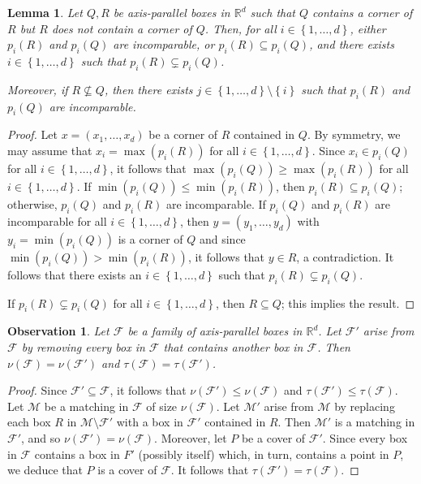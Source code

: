 \documentclass[12pt]{amsart}
\theoremstyle{plain}
\newtheorem{lemma}[theorem]{Lemma}
\newtheorem{observation}[theorem]{Observation}
\theoremstyle{definition}
\theoremstyle{remark}
\newcommand{\F}{\mathcal{F}}
\newcommand{\M}{\mathcal{M}}
\newcommand{\R}{\mathbb{R}}
\newcommand{\sset}[1]{\left\{#1\right\}}
\begin{document}
\begin{lemma} \label{lem:contains} Let $Q, R$ be axis-parallel boxes in $\R^d$ such that $Q$ contains a corner of $R$ but $R$ does not contain a corner of $Q$. Then, for all $i \in \sset{1, \dots, d}$, either $p_i(R)$ and $p_i(Q)$ are incomparable, or $p_i(R) \subseteq p_i(Q)$, and there exists  $i \in \sset{1, \dots, d}$ such that $p_i(R) \subsetneq p_i(Q)$. 

Moreover, if $R \not\subseteq Q$, then there exists  $j \in \sset{1, \dots, d} \setminus \sset{i}$ such that $p_i(R)$ and $p_i(Q)$ are incomparable. 
\end{lemma}
\begin{proof}
Let $x = (x_1, \dots, x_d)$ be a corner of $R$ contained in $Q$. By symmetry, we may assume that $x_i = \max(p_i(R))$ for all $i \in \sset{1, \dots, d}$. Since $x_i \in p_i(Q)$ for all $i \in \sset{1, \dots, d}$, it follows that $\max(p_i(Q)) \geq \max(p_i(R))$ for all $i \in \sset{1, \dots, d}$. If $\min(p_i(Q)) \leq \min(p_i(R))$, then $p_i(R) \subseteq p_i(Q)$; otherwise, $p_i(Q)$ and $p_i(R)$ are incomparable. If $p_i(Q)$ and $p_i(R)$ are incomparable for all $i \in \sset{1, \dots, d}$, then $y = (y_1, \dots, y_d)$ with $y_i = \min(p_i(Q))$ is a corner of $Q$ and since $\min(p_i(Q)) > \min(p_i(R))$, it follows that $y \in R$, a contradiction. It follows that there exists an $i \in \sset{1, \dots, d}$ such that $p_i(R) \subsetneq p_i(Q)$. 

If $p_i(R) \subsetneq p_i(Q)$ for all $i \in \sset{1, \dots, d}$, then $R \subseteq Q$; this implies the result.
\end{proof}

\begin{observation} \label{lem:contains2} Let $\F$ be a family of axis-parallel boxes in $\R^d$. Let $\F'$ arise from $\F$ by removing every box in $\F$ that contains another box in $\F$. Then $\nu(\F) = \nu(\F')$ and $\tau(\F) = \tau(\F')$. 
\end{observation}
\begin{proof}
Since $\F' \subseteq \F$, it follows that $\nu(\F') \leq \nu(\F)$ and $\tau(\F') \leq \tau(\F)$. Let $\M$ be a matching in $\F$ of size $\nu(\F)$. Let $\M'$ arise from $\M$ by replacing each box $R$ in $\M \setminus \F'$ with a box in $\F'$ contained in $R$. Then $\M'$ is a matching in $\F'$, and so $\nu(\F') = \nu(\F)$. Moreover, let $P$  be a cover of $\F'$. Since every box in $\F$ contains a box in $F'$ (possibly itself) which, in turn, contains a point in $P$, we deduce that $P$ is a cover of $\F$. It follows that $\tau(\F') = \tau(\F)$. 
\end{proof}
\end{document}

